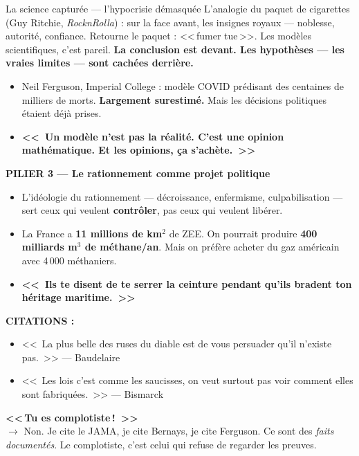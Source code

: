 \documentclass[a4paper,11pt]{article}
\newcommand{\phraseforte}[1]{\textbf{\textcolor{ModeRouge}{<<~#1~>>}}}
\newcommand{\stat}[1]{\textbf{\textcolor{ChapColor}{#1}}}
\begin{document}
\begin{ficherouge}{La science captur\'{e}e --- l'hypocrisie d\'{e}masqu\'{e}e}
L'analogie du paquet de cigarettes (Guy Ritchie, \textit{RocknRolla}) : sur la face avant, les insignes royaux --- noblesse, autorit\'{e}, confiance. Retourne le paquet : <<\,fumer tue\,>>. Les mod\`{e}les scientifiques, c'est pareil. \textbf{La conclusion est devant. Les hypoth\`{e}ses --- les vraies limites --- sont cach\'{e}es derri\`{e}re.}

\begin{itemize}[nosep, label=\color{ModeRouge}]
  \item Neil Ferguson, Imperial College : mod\`{e}le COVID pr\'{e}disant des centaines de milliers de morts. \textbf{Largement surestim\'{e}.} Mais les d\'{e}cisions politiques \'{e}taient d\'{e}j\`{a} prises.
  \item \phraseforte{Un mod\`{e}le n'est pas la r\'{e}alit\'{e}. C'est une opinion math\'{e}matique. Et les opinions, \c{c}a s'ach\`{e}te.}
\end{itemize}

\vspace{0.3cm}
\textbf{\color{ModeRouge}PILIER 3 --- Le rationnement comme projet politique}

\begin{itemize}[nosep, label=\color{ModeRouge}]
  \item L'id\'{e}ologie du rationnement --- d\'{e}croissance, enfermisme, culpabilisation --- sert ceux qui veulent \textbf{contr\^{o}ler}, pas ceux qui veulent lib\'{e}rer.
  \item La France a \stat{11 millions de km$^2$} de ZEE. On pourrait produire \stat{400 milliards m$^3$ de m\'{e}thane/an}. Mais on pr\'{e}f\`{e}re acheter du gaz am\'{e}ricain avec 4\,000 m\'{e}thaniers.
  \item \phraseforte{Ils te disent de te serrer la ceinture pendant qu'ils bradent ton h\'{e}ritage maritime.}
\end{itemize}

\vspace{0.3cm}
\textbf{CITATIONS :}
\begin{itemize}[nosep, font=\itshape]
  \item <<~La plus belle des ruses du diable est de vous persuader qu'il n'existe pas.~>> --- Baudelaire
  \item <<~Les lois c'est comme les saucisses, on veut surtout pas voir comment elles sont fabriqu\'{e}es.~>> --- Bismarck
\end{itemize}

\begin{contrearg}
\textbf{<<\,Tu es complotiste\,!~>>}\\
$\rightarrow$ Non. Je cite le JAMA, je cite Bernays, je cite Ferguson. Ce sont des \emph{faits document\'{e}s}. Le complotiste, c'est celui qui refuse de regarder les preuves.


\end{contrearg}
\end{ficherouge}
\end{document}
